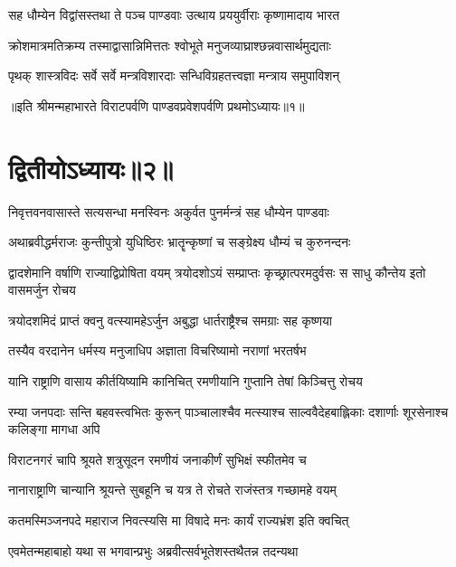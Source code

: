 \twolineshloka
{सह धौम्येन विद्वांसस्तथा ते पञ्च पाण्डवाः}
{उत्थाय प्रययुर्वीराः कृष्णामादाय भारत}


\twolineshloka
{क्रोशमात्रमतिक्रम्य तस्माद्वासान्निमित्ततः}
{श्वोभूते मनुजव्याघ्राश्छन्नवासार्थमुद्यताः}


\twolineshloka
{पृथक् शास्त्रविदः सर्वे सर्वे मन्त्रविशारदाः}
{सन्धिविग्रहतत्त्वज्ञा मन्त्राय समुपाविशन्}

॥इति श्रीमन्महाभारते विराटपर्वणि पाण्डवप्रवेशपर्वणि प्रथमोऽध्यायः॥१॥

\chapter{द्वितीयोऽध्यायः॥२॥}

\twolineshloka
{निवृत्तवनवासास्ते सत्यसन्धा मनस्विनः}
{अकुर्वत पुनर्मन्त्रं सह धौम्येन पाण्डवाः}


\twolineshloka
{अथाब्रवीद्धर्मराजः कुन्तीपुत्रो युधिष्ठिरः}
{भ्रातॄन्कृष्णां च सङ्ग्रेक्ष्य धौम्यं च कुरुनन्दनः}


\threelineshloka
{द्वादशेमानि वर्षाणि राज्याद्विप्रोषिता वयम्}
{त्रयोदशोऽयं सम्प्राप्तः कृच्छ्रात्परमदुर्वसः}
{स साधु कौन्तेय इतो वासमर्जुन रोचय}


\twolineshloka
{त्रयोदशमिदं प्राप्तं क्वनु वत्स्यामहेऽर्जुन}
{अबुद्धा धार्तराष्ट्रैश्च समग्राः सह कृष्णया}




\twolineshloka
{तस्यैव वरदानेन धर्मस्य मनुजाधिप}
{अज्ञाता विचरिष्यामो नराणां भरतर्षभ}


\twolineshloka
{यानि राष्ट्राणि वासाय कीर्तयिष्यामि कानिचित्}
{रमणीयानि गुप्तानि तेषां किञ्चित्तु रोचय}


\threelineshloka
{रम्या जनपदाः सन्ति बहवस्त्वभितः कुरून्}
{पाञ्चालाश्चैव मत्स्याश्च साल्ववैदेहबाह्लिकाः}
{दशार्णाः शूरसेनाश्च कलिङ्गा मागधा अपि}


\twolineshloka
{विराटनगरं चापि श्रूयते शत्रुसूदन}
{रमणीयं जनाकीर्णं सुभिक्षं स्फीतमेव च}


\twolineshloka
{नानाराष्ट्राणि चान्यानि श्रूयन्ते सुबहूनि च}
{यत्र ते रोचते राजंस्तत्र गच्छामहे वयम्}


\twolineshloka
{कतमस्मिञ्जनपदे महाराज निवत्स्यसि}
{मा विषादे मनः कार्यं राज्यभ्रंश इति क्वचित्}




\twolineshloka
{एवमेतन्महाबाहो यथा स भगवान्प्रभुः}
{अब्रवीत्सर्वभूतेशस्तथैतन्न तदन्यथा}


